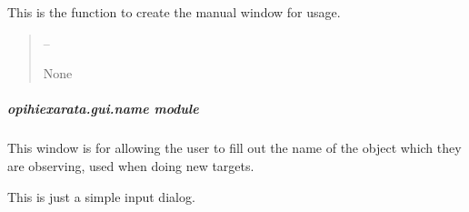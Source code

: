 \documentclass[letterpaper,11pt,english]{sphinxmanual}
\begin{document}
\begin{savenotes}\begin{fulllineitems}
\label{\detokenize{code/opihiexarata.gui.manual:opihiexarata.gui.manual.start_manual_window}}
\pysigstartsignatures
{}
\pysigstopsignatures
\sphinxAtStartPar
This is the function to create the manual window for usage.
\begin{quote}\begin{description}
\sphinxAtStartPar
{} – 

\sphinxAtStartPar
None

\end{description}\end{quote}

\end{fulllineitems}\end{savenotes}


\sphinxstepscope


\subparagraph{opihiexarata.gui.name module}
\label{\detokenize{code/opihiexarata.gui.name:module-opihiexarata.gui.name}}\label{\detokenize{code/opihiexarata.gui.name:opihiexarata-gui-name-module}}\label{\detokenize{code/opihiexarata.gui.name::doc}}
\sphinxAtStartPar
This window is for allowing the user to fill out the name of the object
which they are observing, used when doing new targets.

\sphinxAtStartPar
This is just a simple input dialog.
\end{document}
